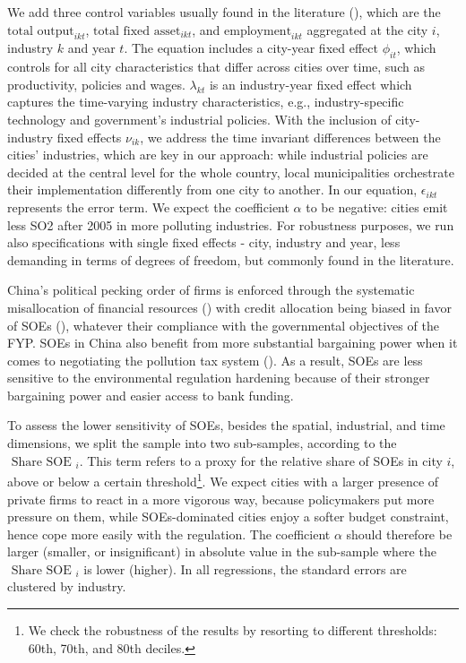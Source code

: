 \documentclass[12pt]{article}
\begin{document}
We add three control variables usually found in the literature (\cite{Andersen2016-pa,Andersen2017-wf}), which are the $\text{total output}_{ikt}$, $\text{total fixed asset}_{ikt}$, and $\text{employment}_{ikt}$ aggregated at the city $i$, industry $k$ and year $t$. The equation includes a city-year fixed effect $\phi_{it}$, which controls for all city characteristics that differ across cities over time, such as productivity, policies and wages. $\lambda_{kt}$ is an industry-year fixed effect which captures the time-varying industry characteristics, e.g., industry-specific technology and government's industrial policies. With the inclusion of city-industry fixed effects $\nu_{ik}$, we address the time invariant differences between the cities' industries, which are key in our approach: while industrial policies are decided at the central level for the whole country, local municipalities orchestrate their implementation differently from one city to another. In our equation, $\epsilon_{ikt}$ represents the error term. We expect the coefficient $\alpha$ to be negative: cities emit less SO2 after 2005 in more polluting industries. For robustness purposes, we run also specifications with single fixed effects - city, industry and year, less demanding in terms of degrees of freedom, but commonly found in the literature. 


China's political pecking order of firms is enforced through the systematic misallocation of financial resources (\cite{Dollar2007-dr}) with credit allocation being biased in favor of SOEs (\cite{Brandt2003-hu,Ferri2009-lh,Hale2011-ma,Huang2003-oa}), whatever their compliance with the governmental objectives of the FYP. SOEs in China also benefit from more substantial bargaining power when it comes to negotiating the pollution tax system (\cite{Wang2003-ar,Wang2005-yy}). As a result, SOEs are less sensitive to the environmental regulation hardening because of their stronger bargaining power and easier access to bank funding. 


To assess the lower sensitivity of SOEs, besides the spatial, industrial, and time dimensions, we split the sample into two sub-samples, according to the $\text { Share SOE }_{i}$. This term refers to a proxy for the relative share of SOEs in city $i$, above or below a certain threshold\footnote{ We check the robustness of the results by resorting to different thresholds: 60th, 70th, and 80th deciles.}. We expect cities with a larger presence of private firms to react in a more vigorous way, because policymakers put more pressure on them, while SOEs-dominated cities enjoy a softer budget constraint, hence cope more easily with the regulation. The coefficient $\alpha$ should therefore be larger (smaller, or insignificant) in absolute value in the sub-sample where the $\text { Share SOE }_{i}$ is lower (higher). In all regressions, the standard errors are clustered by industry.
\end{document}
